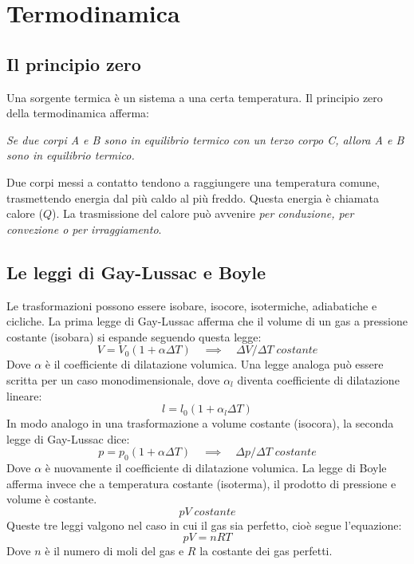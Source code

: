 \documentclass{article}
\begin{document}
\section{Termodinamica}

\subsection{Il principio zero}
Una sorgente termica è un sistema a una certa temperatura. Il principio zero della termodinamica afferma:
\vspace{3mm}

\textit{Se due corpi A e B sono in equilibrio termico con un terzo corpo C, allora A e B sono in equilibrio termico.}
\vspace{3mm}

Due corpi messi a contatto tendono a raggiungere una temperatura comune, trasmettendo energia dal più caldo al più freddo. Questa energia è chiamata calore ($Q$). La trasmissione del calore può avvenire \textit{per conduzione, per convezione o per irraggiamento}.


\subsection{Le leggi di Gay-Lussac e Boyle}
Le trasformazioni possono essere isobare, isocore, isotermiche, adiabatiche e cicliche. La prima legge di Gay-Lussac afferma che il volume di un gas a pressione costante (isobara) si espande seguendo questa legge:
\begin{equation}
    V=V_0 (1+\alpha \Delta T) \quad \implies \quad \Delta V/\Delta T \;costante
\end{equation}
Dove $\alpha$ è il coefficiente di dilatazione volumica.
Una legge analoga può essere scritta per un caso monodimensionale, dove $\alpha_l$ diventa coefficiente di dilatazione lineare:
\begin{equation}
    l=l_0(1+\alpha_l \Delta T)
\end{equation}
In modo analogo in una trasformazione a volume costante (isocora), la seconda legge di Gay-Lussac dice:
\begin{equation}
    p=p_0(1+\alpha \Delta T) \quad \implies \quad \Delta p/\Delta T \;costante
\end{equation}
Dove $\alpha$ è nuovamente il coefficiente di dilatazione volumica.
La legge di Boyle afferma invece che a temperatura costante (isoterma), il prodotto di pressione e volume è costante.
\begin{equation}
    pV \; costante
\end{equation}
Queste tre leggi valgono nel caso in cui il gas sia perfetto, cioè segue l'equazione:
\begin{equation}
    pV=nRT
\end{equation}
Dove $n$ è il numero di moli del gas e $R$ la costante dei gas perfetti.
\end{document}
